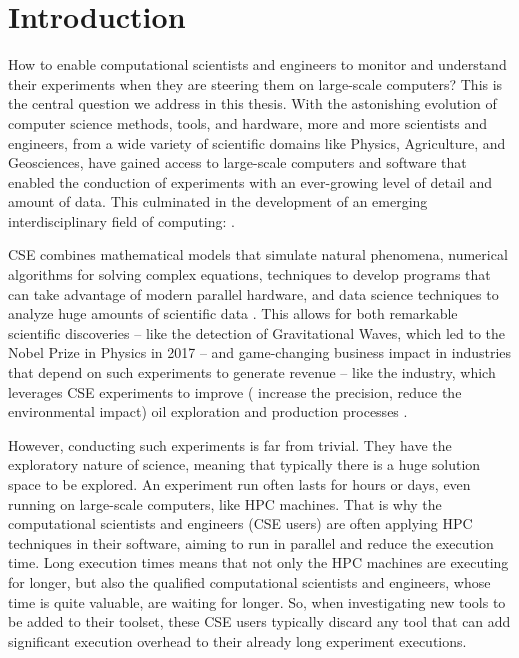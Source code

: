 \chapter{Introduction} \label{chap_intro}

How to enable computational scientists and engineers to monitor and understand their experiments when they are steering them on large-scale computers? 
This is the central question we address in this thesis.
With the astonishing evolution of computer science methods, tools, and hardware, more and more scientists and engineers, from a wide variety of scientific domains like Physics, Agriculture, and Geosciences, have gained access to large-scale computers and software that enabled the conduction of experiments with an ever-growing level of detail and amount of data.
This culminated in the development of an emerging interdisciplinary field of computing:  \cite{Rude2016Research}.


CSE combines mathematical models that simulate natural phenomena, numerical algorithms for solving complex equations,   techniques to develop programs that can take advantage of modern parallel hardware, and data science techniques to analyze huge amounts of scientific data \cite{Rude2016Research}.
This allows for both remarkable scientific discoveries -- like the detection of Gravitational Waves, which led to the Nobel Prize in Physics in 2017 \cite{F.daSilva2016Pegasus} -- and game-changing business impact in industries that depend on such experiments to generate revenue -- like the  industry, which leverages CSE experiments to improve (\eg{} increase the precision, reduce the environmental impact) oil exploration and production processes \cite{ibm_research_editorial_staff_ai_2018}.

However, conducting such experiments is far from trivial. They have the exploratory nature of science, meaning that typically there is a huge solution space to be explored. An experiment run often lasts for hours or days, even running on large-scale computers, like HPC machines. That is why the computational scientists and engineers (CSE users) are often applying HPC techniques in their software, aiming to run in parallel and reduce the execution time. 
Long execution times means that not only the HPC machines are executing for longer, but also the qualified computational scientists and engineers, whose time is quite valuable, are waiting for longer. So, when investigating new tools to be added to their toolset, these CSE users typically discard any tool that can add significant execution overhead to their already long experiment executions.

